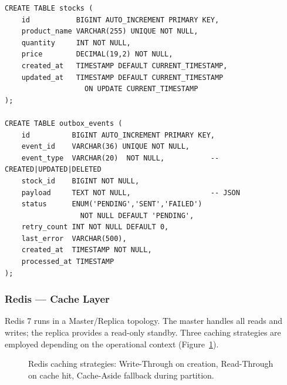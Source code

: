 \documentclass[12pt,a4paper,twoside]{article}
\begin{document}
\begin{lstlisting}[style=sqlStyle, caption={Database schema}]
CREATE TABLE stocks (
    id           BIGINT AUTO_INCREMENT PRIMARY KEY,
    product_name VARCHAR(255) UNIQUE NOT NULL,
    quantity     INT NOT NULL,
    price        DECIMAL(19,2) NOT NULL,
    created_at   TIMESTAMP DEFAULT CURRENT_TIMESTAMP,
    updated_at   TIMESTAMP DEFAULT CURRENT_TIMESTAMP
                   ON UPDATE CURRENT_TIMESTAMP
);

CREATE TABLE outbox_events (
    id          BIGINT AUTO_INCREMENT PRIMARY KEY,
    event_id    VARCHAR(36) UNIQUE NOT NULL,
    event_type  VARCHAR(20)  NOT NULL,           -- CREATED|UPDATED|DELETED
    stock_id    BIGINT NOT NULL,
    payload     TEXT NOT NULL,                   -- JSON
    status      ENUM('PENDING','SENT','FAILED')
                  NOT NULL DEFAULT 'PENDING',
    retry_count INT NOT NULL DEFAULT 0,
    last_error  VARCHAR(500),
    created_at  TIMESTAMP NOT NULL,
    processed_at TIMESTAMP
);
\end{lstlisting}

\subsubsection{Redis — Cache Layer}

Redis 7 runs in a Master/Replica topology.
The master handles all reads and writes; the replica provides a
read-only standby.
Three caching strategies are employed depending on the operational
context (Figure~\ref{fig:cache}).

\begin{figure}[H]
\centering
{}
\caption{Redis caching strategies: Write-Through on creation, Read-Through on
  cache hit, Cache-Aside fallback during partition.}
\label{fig:cache}
\end{figure}
\end{document}
